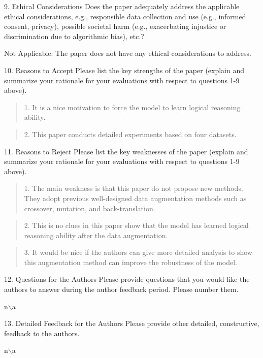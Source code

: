 \documentclass{article}
\begin{document}
9. {Ethical Considerations} Does the paper adequately address the applicable ethical considerations, e.g., responsible data collection and use (e.g., informed consent, privacy), possible societal harm (e.g., exacerbating injustice or discrimination due to algorithmic bias), etc.?

Not Applicable: The paper does not have any ethical considerations to address.

10. {Reasons to Accept} Please list the key strengths of the paper (explain and summarize your rationale for your evaluations with respect to questions 1-9 above). 

\begin{quote}
1. It is a nice motivation to force the model to learn logical reasoning ability. 
\end{quote}

\begin{quote}
2. This paper conducts detailed experiments based on four datasets.
\end{quote}

11. {Reasons to Reject} Please list the key weaknesses of the paper (explain and summarize your rationale for your evaluations with respect to questions 1-9 above).

\begin{quote}
1. The main weakness is that this paper do not propose new methods. They adopt previous well-designed data augmentation methods such as crossover, mutation, and back-translation.
\end{quote}


\begin{quote}
2. This is no clues in this paper show that the model has learned logical reasoning ability after the data augmentation. 
\end{quote}

\begin{quote}
3. It would be nice if the authors can give more detailed analysis to show this augmentation method can improve the robustness of the model.
\end{quote}

12. {Questions for the Authors} Please provide questions that you would like the authors to answer during the author feedback period. Please number them.

n$\backslash$a

13. {Detailed Feedback for the Authors} Please provide other detailed, constructive, feedback to the authors.

n$\backslash$a
\end{document}
